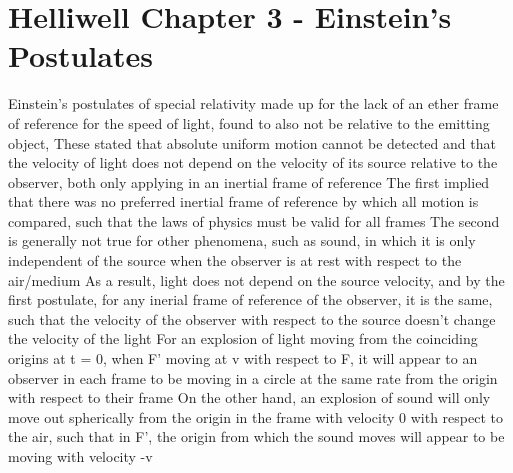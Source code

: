 \documentclass[11 pt, twoside]{article}
\newenvironment{outline*}
{
	\begin{outline}[enumerate]
	}
	{\end{outline}
}
\begin{document}
\section{Helliwell Chapter 3 - Einstein's Postulates}
\begin{outline*}
\1 Einstein's postulates of special relativity made up for the lack of an ether frame of reference for the speed of light, found to also not be relative to the emitting object, 
\2 These stated that absolute uniform motion cannot be detected and that the velocity of light does not depend on the velocity of its source relative to the observer, both only applying in an inertial frame of reference
\3 The first implied that there was no preferred inertial frame of reference by which all motion is compared, such that the laws of physics must be valid for all frames
\3 The second is generally not true for other phenomena, such as sound, in which it is only independent of the source when the observer is at rest with respect to the air/medium
\2 As a result, light does not depend on the source velocity, and by the first postulate, for any inerial frame of reference of the observer, it is the same, such that the velocity of the observer with respect to the source doesn't change the velocity of the light
\1 For an explosion of light moving from the coinciding origins at t = 0, when F' moving at v with respect to F, it will appear to an observer in each frame to be moving in a circle at the same rate from the origin with respect to their frame
\2 On the other hand, an explosion of sound will only move out spherically from the origin in the frame with velocity 0 with respect to the air, such that in F', the origin from which the sound moves will appear to be moving with velocity -v
\end{outline*}
\end{document}
